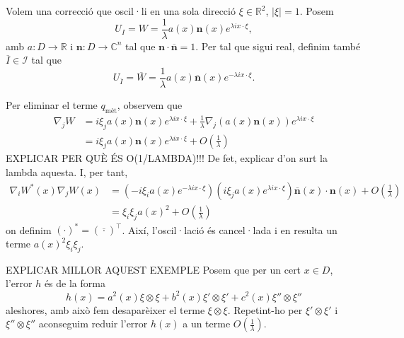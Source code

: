 Volem una correcció que oscil·li en una sola direcció $\xi\in\mathbb R^2$, $|\xi|=1$. Posem
\begin{equation*}
    U_I = W = \frac1\lambda a(x)\textbf{n}(x)e^{\lambda i x \cdot \xi},
\end{equation*}
amb $a:D\to\mathbb R$ i $\textbf{n}:D\to\mathbb C^n$ tal que $\textbf{n}\cdot \overline{\textbf{n}}=1$. Per tal que sigui real, definim també $\overline I\in\mathcal I$ tal que 
\begin{equation*}
    U_{\overline{I}} = \overline W = \frac1\lambda a(x)\overline{\textbf{n}}(x)e^{-\lambda i x \cdot \xi}.
\end{equation*}

Per eliminar el terme $q_{\text{mèt}}$, observem que
\begin{equation*}
    \begin{aligned}
    \nabla_j W &= i\xi_j a(x)\textbf{n}(x)e^{\lambda i x \cdot \xi} + \frac{1}{\lambda}\nabla_j (a(x)\textbf{n}(x))e^{\lambda i x \cdot \xi}\\
    &=i\xi_j a(x)\textbf{n}(x)e^{\lambda i x \cdot \xi} + O(\frac{1}{\lambda})
    \end{aligned}
\end{equation*}
{\color{blue} EXPLICAR PER QUÈ ÉS O(1/LAMBDA)!!! De fet, explicar d'on surt la lambda aquesta.}
I, per tant,
\begin{equation*}
    \begin{aligned}
    \nabla_i W^*(x) \nabla_jW(x)&= (-i\xi_ia(x)e^{-\lambda i x \cdot \xi})(i\xi_ja(x)e^{\lambda i x \cdot \xi})\overline{\textbf{n}}(x) \cdot\textbf{n}(x) + O(\frac{1}{\lambda})\\
    &= \xi_i\xi_j a(x)^2 + O(\frac{1}{\lambda})
    \end{aligned}
\end{equation*}
on definim $(\cdot)^* = (\overline{\cdot})^\intercal$. Així, l'oscil·lació és cancel·lada i en resulta un terme $a(x)^2\xi_i\xi_j$.
\begin{ex}
    {\color{blue} EXPLICAR MILLOR AQUEST EXEMPLE}
    Posem que per un cert $x\in D$, l'error $h$ és de la forma
    \begin{equation*}
        h(x) = a^2(x)\xi \otimes \xi + b^2(x)\xi' \otimes \xi' + c^2(x)\xi'' \otimes \xi''
    \end{equation*}
    aleshores, amb això fem desaparèixer el terme $\xi \otimes \xi$. Repetint-ho per $\xi' \otimes \xi'$ i $\xi'' \otimes \xi''$ aconseguim reduir l'error $h(x)$ a un terme $O(\frac{1}{\lambda})$.
\end{ex}
